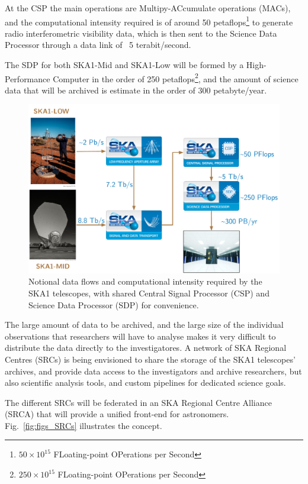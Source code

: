 \documentclass[a4paper,
               biblatex,       %
               keeplastbox,    %
               ]{jacow-2_1}    %
\begin{document}
At the CSP the main operations are Multipy-ACcumulate operations (MACs), and the computational intensity required is of around 50 petaflops\footnote{$50 \times 10^{15}$ FLoating-point OPerations per Second} to generate radio interferometric visibility data, which is then sent to the Science Data Processor through a data link of ~5 terabit/second.

The SDP for both SKA1-Mid and SKA1-Low will be formed by a High-Performance Computer in the order of 250 petaflops\footnote{$250\times10^{15}$ FLoating-point OPerations per Second}, and the amount of science data that will be archived is estimate in the order of 300 petabyte/year. 

\begin{figure}[!tb]
  \centering
    \includegraphics[width=\columnwidth]{figs/SKA1_NotionalDataFlow.pdf}
  \caption{Notional data flows and computational intensity required by the SKA1 telescopes, with shared Central Signal Processor (CSP) and Science Data Processor (SDP) for convenience.}
  \label{fig:figs_SKA1_NotionalDataFlow}
\end{figure}

The large amount of data to be archived, and the large size of the individual observations that researchers will have to analyse makes it very difficult to distribute the data directly to the investigatores. A network of SKA Regional Centres (SRCs) is being envisioned to share the storage of the SKA1 telescopes' archives, and provide data access to the investigators and archive researchers, but also scientific analysis tools, and custom pipelines for dedicated science goals.	

The different SRCs will be federated in an SKA Regional Centre Alliance (SRCA) that will provide a unified front-end for astronomers. Fig.~\ref{fig:figs_SRCs} illustrates the concept.
\end{document}
